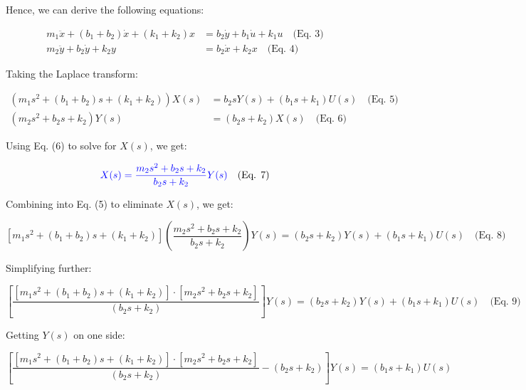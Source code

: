 \documentclass{article}
\begin{document}
Hence, we can derive the following equations:

\begin{equation*}
	\begin{aligned}
		m_1 \ddot{x} + (b_1 + b_2) \dot{x} + (k_1 + k_2) x & = b_2 \dot{y} + b_1 \dot{u} + k_1 u \quad \text{(Eq. 3)} \\
		m_2 \ddot{y} + b_2 \dot{y} + k_2 y                 & = b_2 \dot{x} + k_2 x \quad \text{(Eq. 4)}               
	\end{aligned}
\end{equation*}

Taking the Laplace transform:

\begin{equation*}
	\begin{aligned}
		(m_1 s^2 + (b_1 + b_2)s + (k_1 + k_2))X(s) & = b_2 s Y(s) + (b_1 s + k_1) U(s) \quad \text{(Eq. 5)} \\
		(m_2 s^2 + b_2 s + k_2)Y(s)                & = (b_2 s + k_2) X(s) \quad \text{(Eq. 6)}              
	\end{aligned}
\end{equation*}

Using Eq. (6) to solve for \( X(s) \), we get:

\begin{equation*}
	\textcolor{blue}{X(s) = \frac{m_2 s^2 + b_2 s + k_2}{b_2 s + k_2}Y(s)} \quad \text{(Eq. 7)}
\end{equation*}

Combining into Eq. (5) to eliminate \( X(s) \), we get:

\begin{equation*}
	\left[ m_1 s^2 + (b_1 + b_2) s + (k_1 + k_2) \right] \left( \frac{m_2 s^2 + b_2 s + k_2}{b_2 s + k_2} \right) Y(s)  = (b_2 s + k_2) Y(s) + (b_1 s + k_1) U(s) \quad \text{(Eq. 8)}
\end{equation*}

Simplifying further:

\begin{equation*}
	\left[ \frac{[m_1 s^2 + (b_1 + b_2) s + (k_1 + k_2)]\cdot [m_2 s^2 + b_2 s + k_2]}{(b_2 s + k_2)} \right] Y(s) = (b_2 s + k_2) Y(s) + (b_1 s + k_1) U(s) \quad \text{(Eq. 9)}
\end{equation*}

Getting \( Y(s) \) on one side:

\begin{equation*}
	\left[ \frac{[m_1 s^2 + (b_1 + b_2) s + (k_1 + k_2)]\cdot [m_2 s^2 + b_2 s + k_2]}{(b_2 s + k_2)} - (b_2 s + k_2) \right] Y(s) = (b_1 s + k_1) U(s)
\end{equation*}
\end{document}
